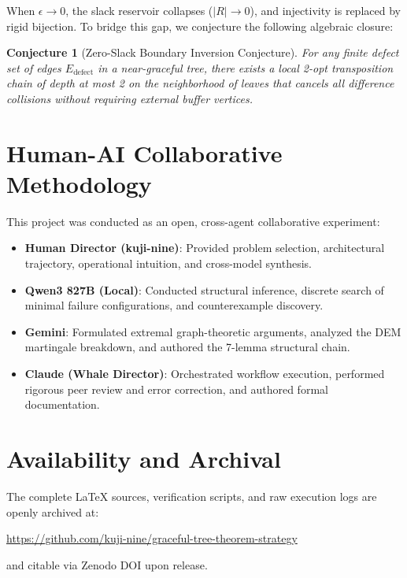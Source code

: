 \documentclass[11pt,a4paper]{article}
\newtheorem{conjecture}[theorem]{Conjecture}
\begin{document}
When $\epsilon \to 0$, the slack reservoir collapses ($|R| \to 0$), and injectivity is replaced by rigid bijection. To bridge this gap, we conjecture the following algebraic closure:

\begin{conjecture}[Zero-Slack Boundary Inversion Conjecture]\label{conj:zeroslack}
For any finite defect set of edges $E_{\text{defect}}$ in a near-graceful tree, there exists a local 2-opt transposition chain of depth at most 2 on the neighborhood of leaves that cancels all difference collisions without requiring external buffer vertices.
\end{conjecture}

\section{Human-AI Collaborative Methodology}

This project was conducted as an open, cross-agent collaborative experiment:
\begin{itemize}
    \item \textbf{Human Director (kuji-nine)}: Provided problem selection, architectural trajectory, operational intuition, and cross-model synthesis.
    \item \textbf{Qwen3 827B (Local)}: Conducted structural inference, discrete search of minimal failure configurations, and counterexample discovery.
    \item \textbf{Gemini}: Formulated extremal graph-theoretic arguments, analyzed the DEM martingale breakdown, and authored the 7-lemma structural chain.
    \item \textbf{Claude (Whale Director)}: Orchestrated workflow execution, performed rigorous peer review and error correction, and authored formal documentation.
\end{itemize}

\section*{Availability and Archival}
The complete LaTeX sources, verification scripts, and raw execution logs are openly archived at:
\begin{center}
\url{https://github.com/kuji-nine/graceful-tree-theorem-strategy}
\end{center}
and citable via Zenodo DOI upon release.
\end{document}

